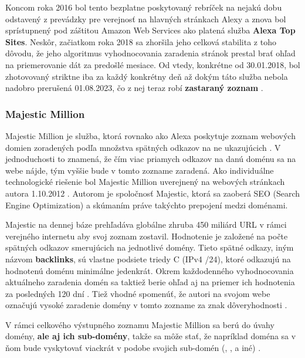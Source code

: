 Koncom roka 2016 bol tento bezplatne poskytovaný rebríček na nejakú dobu odstavený z prevádzky pre verejnosť na hlavných stránkach Alexy a znova bol sprístupnený pod záštitou Amazon Web Services ako platená služba \textbf{Alexa Top Sites}. 
Neskôr, začiatkom roka 2018 sa zhoršila jeho celková stabilita z toho dôvodu, že jeho algoritmus vyhodnocovania zaradenia stránok prestal brať ohľad na priemerovanie dát za predošlé mesiace.
Od vtedy, konkrétne od 30.01.2018, bol zhotovovaný striktne iba za každý konkrétny deň \cite{tranco} až dokým táto služba nebola nadobro prerušená 01.08.2023, čo z nej teraz robí \textbf{zastaraný zoznam} \cite{tranco-methodology}.

\subsubsection{Majestic Million}

Majestic Million je služba, ktorá rovnako ako Alexa poskytuje zoznam webových domien zoradených podľa množstva spätných odkazov na ne ukazujúcich \cite{majestic-million-homepage}\cite{majestic-million-ranking}.
V jednoduchosti to znamená, že čím viac priamych odkazov na danú doménu sa na webe nájde, tým vyššie bude v tomto zozname zaradená. 
Ako individuálne technologické riešenie bol Majestic Million uverejnený na webových stránkach autora 1.10.2012 \cite{majestic-million-publication}.
Autorom je spoločnosť Majestic, ktorá sa zaoberá SEO (Search Engine Optimization) a skúmaním práve takýchto prepojení medzi doménami.

Majestic na dennej báze prehľadáva globálne zhruba 450 miliárd URL v rámci verejného internetu aby svoj zoznam zostavil. 
Hodnotenie je založené na počte spätných odkazov smerujúcich na jednotlivé domény. Tieto spätné odkazy, iným názvom \textbf{backlinks}, sú vlastne podsiete triedy C (IPv4 /24), ktoré odkazujú
na hodnotenú doménu minimálne jedenkrát.
Okrem každodenného vyhodnocovania aktuálneho zaradenia domén sa taktiež berie ohľad aj na priemer ich hodnotenia za posledných 120 dní \cite{tranco-methodology}.
Tiež vhodné spomenúť, že autori na svojom webe označujú vysoké zaradenie domény v tomto zozname za znak dôveryhodnosti \cite{majestic-million-homepage}.

V rámci celkového výstupného zoznamu Majestic Million sa berú do úvahy domény, \textbf{ale aj ich sub-domény}, takže sa môže stať, že napríklad doména  
sa v ňom bude vyskytovať viackrát v podobe svojich sub-domén (, ,  a iné) \cite{majestic-million-sub-domain-filtered}.

